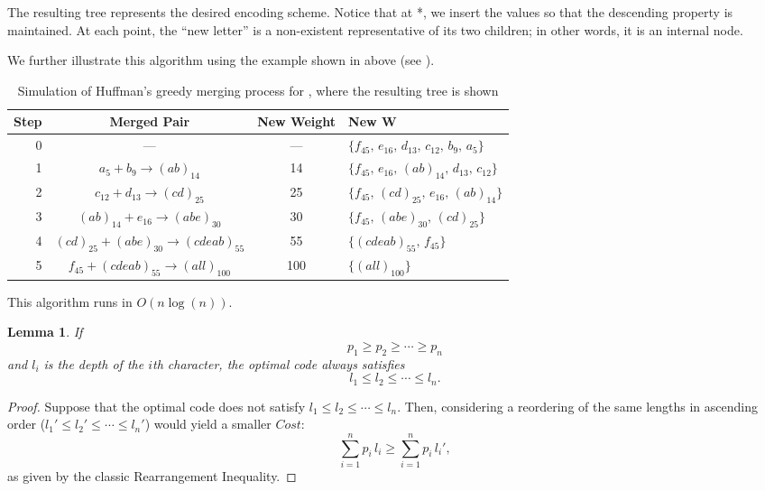 \documentclass[a4paper,10pt,english]{scrartcl}
\newtheorem{lemma}[theorem]{Lemma}
\begin{document}
The resulting tree represents the desired encoding scheme. Notice that at *, we insert the values so that the descending property is maintained. At each point, the ``new letter'' is a non-existent representative of its two children; in other words, it is an internal node. 

We further illustrate this algorithm using the example shown in  above (see ).

\begin{table}[h]
\centering
\begin{tabular}{r|c|c|l}
\hline
\textbf{Step} & \textbf{Merged Pair} & \textbf{New Weight} & \textbf{New W} \\ 
\hline
0 & — & — & 
\(\{f_{45},\,e_{16},\,d_{13},\,c_{12},\,b_{9},\,a_{5}\}\) \\[6pt]
1 & \(a_{5}+b_{9}\to (ab)_{14}\) & 14 & 
\(\{f_{45},\,e_{16},\,(ab)_{14},\,d_{13},\,c_{12}\}\) \\[6pt]
2 & \(c_{12}+d_{13}\to (cd)_{25}\) & 25 & 
\(\{f_{45},\,(cd)_{25},\,e_{16},\,(ab)_{14}\}\) \\[6pt]
3 & \((ab)_{14}+e_{16}\to (abe)_{30}\) & 30 & 
\(\{f_{45},\,(abe)_{30},\,(cd)_{25}\}\) \\[6pt]
4 & \((cd)_{25}+(abe)_{30}\to (cdeab)_{55}\) & 55 & 
\(\{(cdeab)_{55},\,f_{45}\}\) \\[6pt]
5 & \(f_{45}+(cdeab)_{55}\to (all)_{100}\) & 100 & 
\(\{(all)_{100}\}\) \\
\hline
\end{tabular}
\caption{Simulation of Huffman's greedy merging process for , where the resulting tree is shown}
\label{tab:huffmansim}
\end{table}

This algorithm runs in $O(n\log(n))$.

\begin{lemma}\label{lem:monotone}
If $$p_1\ge p_2\ge\cdots \ge p_n$$ and $l_i$ is the depth of the $i$th character, the optimal code always satisfies $$l_1 \le l_2\le \cdots \le l_n.$$
\end{lemma}

\begin{proof}
Suppose that the optimal code does not satisfy $l_1 \le l_2\le \cdots \le l_n$. Then, considering a reordering of the same lengths in ascending order ($l_1' \le l_2'\le \cdots \le l_n'$) would yield a smaller $Cost$:
$$\sum_{i=1}^n p_i\,l_i \ge \sum_{i=1}^n p_i\,l_i',$$
as given by the classic Rearrangement Inequality.
\end{proof}
\end{document}
